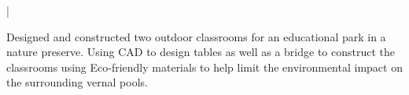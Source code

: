 \documentclass[letterpaper]{deedy-resume}
\begin{document}
\begin{minipage}[t]{0.69\textwidth}
 |
\begin{tightitemize}
\item Designed and constructed two outdoor classrooms for an educational park in a nature preserve. Using CAD to design tables as well as a bridge to construct the classrooms using Eco-friendly materials to help limit the environmental impact on the surrounding vernal pools.
\end{tightitemize}

\end{minipage}
\end{document}
